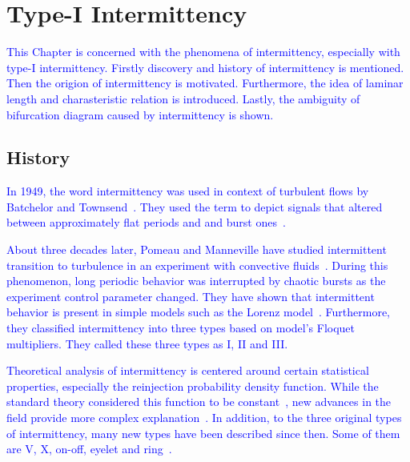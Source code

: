 \chapter{Type-I Intermittency}
\label{chap:type-I intermittency}

\textcolor{blue}{
This Chapter is concerned with the phenomena of intermittency, especially with type-I intermittency.
Firstly discovery and history of intermittency is mentioned.
Then the origion of intermittency is motivated.
Furthermore, the idea of laminar length and charasteristic relation is introduced.
Lastly, the ambiguity of bifurcation diagram caused by intermittency is shown.
}

\section{History}
\textcolor{blue}{
In 1949, the word intermittency was used in context of turbulent flows by Batchelor and Townsend~\cite{Batchelor19491025}.
They used the term to depict signals that altered between approximately flat periods and and burst ones~\cite{Elaskar2017}.
}
\par
\textcolor{blue}{
About three decades later, Pomeau and Manneville have studied intermittent transition to turbulence in an experiment with convective fluids~\cite{Pomeau1980}.
During this phenomenon, long periodic behavior was interrupted by chaotic bursts as the experiment control parameter changed.
They have shown that intermittent behavior is present in simple models such as the Lorenz model~\cite{Lorenz2004}.
Furthermore, they classified intermittency into three types based on model's Floquet multipliers.
They called these three types as I, II and III.
}
\par
\textcolor{blue}{
Theoretical analysis of intermittency is centered around certain statistical properties, especially the reinjection probability density function.
While the standard theory considered this function to be constant~\cite{Dubois1983}, new advances in the field provide more complex explanation~\cite{Elaskar2022}.
In addition, to the three original types of intermittency, many new types have been described since then.
Some of them are V, X, on-off, eyelet and ring~\cite{Elaskar2022}.
}

